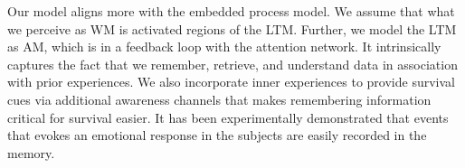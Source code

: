 \documentclass[reprint,amsmath,amssymb,apr,aip,onecolumn, 11pt]{revtex4-1}
\begin{document}


Our model aligns more with the embedded process model. We assume that what we perceive as WM is activated regions of the LTM. Further, we model the LTM as AM, which is in a feedback loop with the attention network. It intrinsically captures the fact that we remember, retrieve, and understand data in association with prior experiences. We also incorporate inner experiences  to provide survival cues via additional awareness channels that makes remembering information critical for survival easier. It has been experimentally demonstrated that events that evokes an emotional response in the subjects are easily recorded in the memory\cite{LeDoux_2000,Phelps_2005}.

 












	

	
	
\end{document}
